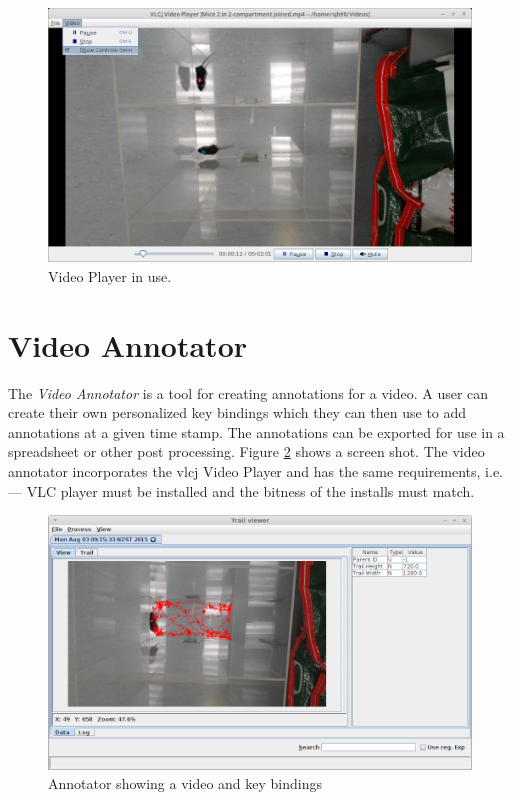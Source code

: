 \documentclass[a4paper]{book}
\begin{document}
 \begin{figure}[htb]
   \centering
   \includegraphics[width=12.0cm]{images/video_player_in_use.png}
   \caption{Video Player in use.}
   \label{VideoPlayerInUse}
 \end{figure}

\section{Video Annotator}
The \textit{Video Annotator} is a tool for creating annotations for a video. A user can
create their own personalized key bindings which they can then use to add annotations at a given time stamp.
The annotations can be exported for use in a spreadsheet or other post processing. Figure \ref{annotator_in_use}
shows a screen shot. The video annotator incorporates the vlcj Video Player and has the same requirements, i.e. --- VLC
player must be installed and the bitness of the installs must match.

\begin{figure}[htb]
  \centering
  \includegraphics[width= 12.0cm]{images/trail_viewer.png}
  \caption{Annotator showing a video and key bindings}
  \label{annotator_in_use}
\end{figure}
\end{document}
